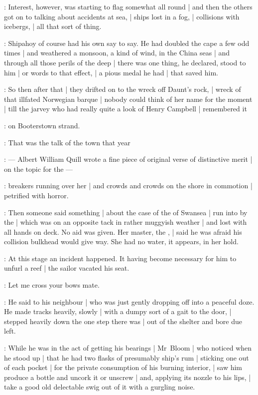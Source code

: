 :
Interest, however, was starting to flag somewhat all round |
and then the others got on to talking about accidents at sea, |
ships lost in a fog, |
collisions with icebergs, |
all that sort of thing.

:
Shipahoy of course had his own say to say.
He had doubled the cape a few odd times |
and weathered a monsoon, a kind of wind, in the China seas |
and through all those perils of the deep |
there was one thing, he declared, stood to him |
or words to that effect, |
a pious medal he had |
that saved him.

:
So then after that |
they drifted on to the wreck off Daunt's rock, |
wreck of that illfated Norwegian barque |
nobody could think of her name for the moment |
till the jarvey who had really quite a look of Henry Campbell |
remembered it

\Campbell:
 on Booterstown strand.

:
That was the talk of the town that year

:
    --- Albert William Quill wrote a fine piece of original verse of distinctive merit |
        on the topic for the  ---

:
breakers running over her |
and crowds and crowds on the shore in commotion |
petrified with horror.

:
Then someone said something |
about the case of the  of Swansea |
run into by the  |
which was on an opposite tack in rather muggyish weather |
and lost with all hands on deck.
No aid was given.
Her master, the , |
said he was afraid his collision bulkhead would give way.
She had no water, it appears, in her hold.

:
At this stage an incident happened.
It having become necessary for him to unfurl a reef |
the sailor vacated his seat.

\Murphy:
Let me cross your bows mate.

:
He said to his neighbour |
who was just gently dropping off into a peaceful doze.
He made tracks heavily, slowly |
with a dumpy sort of a gait to the door, |
stepped heavily down the one step there was |
out of the shelter and bore due left.

:
While he was in the act of getting his bearings |
Mr~Bloom |
who noticed when he stood up |
that he had two flasks of presumably ship's rum |
sticking one out of each pocket |
for the private consumption of his burning interior, |
saw him produce a bottle and uncork it or unscrew |
and, applying its nozzle to his lips, |
take a good old delectable swig
out of it with a gurgling noise.

